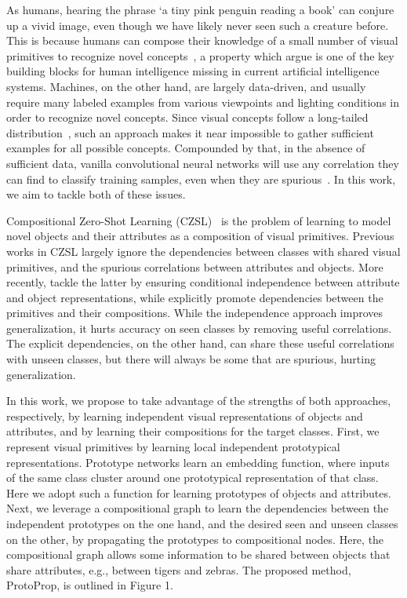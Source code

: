 \documentclass{article}
\begin{document}
As humans, hearing the phrase `a tiny pink penguin reading a book' can conjure up a vivid image, even though we have likely never seen such a creature before. This is because humans can compose their knowledge of a small number of visual primitives to recognize novel concepts~\citep{hebart2020revealing}, a property which \citet{lake2017building} argue is one of the key building blocks for human intelligence missing in current artificial intelligence systems. Machines, on the other hand, are largely data-driven, and usually require many labeled examples from various viewpoints and lighting conditions in order to recognize novel concepts. Since visual concepts follow a long-tailed distribution~\citep{salakhutdinov2011learning, liu2019large}, such an approach makes it near impossible to gather sufficient examples for all possible concepts. Compounded by that, in the absence of sufficient data, vanilla convolutional neural networks will use any correlation they can find to classify training samples, even when they are spurious~\citep{kim2019learning}. In this work, we aim to tackle both of these issues.

Compositional Zero-Shot Learning (CZSL)~\citep{misra2017red} is the problem of learning to model novel objects and their attributes as a composition of visual primitives. Previous works in CZSL \citep{misra2017red, purushwalkam2019task, li2020symmetry} largely ignore the dependencies between classes with shared visual primitives, and the spurious correlations between attributes and objects. More recently, \citet{atzmon2020causal} tackle the latter by ensuring conditional independence between attribute and object representations, while \citet{naeem2021learning} explicitly promote dependencies between the primitives and their compositions. While the independence approach improves generalization, it hurts accuracy on seen classes by removing useful correlations. The explicit dependencies, on the other hand, can share these useful correlations with unseen classes, but there will always be some that are spurious, hurting generalization. 

In this work, we propose to take advantage of the strengths of both approaches, respectively, by learning independent visual representations of objects and attributes, and by learning their compositions for the target classes. First, we represent visual primitives by learning local independent prototypical representations. Prototype networks \citep{snell2017prototypical} learn an embedding function, where inputs of the same class cluster around one prototypical representation of that class. Here we adopt such a function for learning prototypes of objects and attributes. Next, we leverage a compositional graph to learn the dependencies between the independent prototypes on the one hand, and the desired seen and unseen classes on the other, by propagating the prototypes to compositional nodes. Here, the compositional graph allows some information to be shared between objects that share attributes, e.g., between tigers and zebras. The proposed method, ProtoProp, is outlined in Figure 1.
\end{document}
